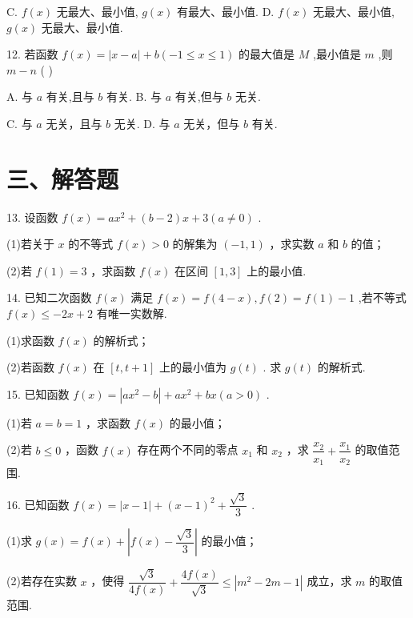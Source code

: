 C. $f\left( x\right)$ 无最大、最小值, $g\left( x\right)$ 有最大、最小值. D. $f\left( x\right)$ 无最大、最小值, $g\left( x\right)$ 无最大、最小值.


12. 若函数 $f\left( x\right)  = \left| {x - a}\right|  + b\left( {-1 \leq  x \leq  1}\right)$ 的最大值是 $M$ ,最小值是 $m$ ,则 $m - n$ ( )

A. 与 $a$ 有关,且与 $b$ 有关. B. 与 $a$ 有关,但与 $b$ 无关.

C. 与 $a$ 无关，且与 $b$ 无关. D. 与 $a$ 无关，但与 $b$ 有关.

\section*{三、解答题}

13. 设函数 $f\left( x\right)  = a{x}^{2} + \left( {b - 2}\right) x + 3\left( {a \neq  0}\right)$ .

(1)若关于 $x$ 的不等式 $f\left( x\right)  > 0$ 的解集为 $\left( {-1,1}\right)$ ，求实数 $a$ 和 $b$ 的值；

(2)若 $f\left( 1\right)  = 3$ ，求函数 $f\left( x\right)$ 在区间 $\left\lbrack  {1,3}\right\rbrack$ 上的最小值.

14. 已知二次函数 $f\left( x\right)$ 满足 $f\left( x\right)  = f\left( {4 - x}\right) ,f\left( 2\right)  = f\left( 1\right)  - 1$ ,若不等式 $f\left( x\right)  \leq   - {2x} + 2$ 有唯一实数解.

(1)求函数 $f\left( x\right)$ 的解析式；

(2)若函数 $f\left( x\right)$ 在 $\left\lbrack  {t,t + 1}\right\rbrack$ 上的最小值为 $g\left( t\right)$ . 求 $g\left( t\right)$ 的解析式.

15. 已知函数 $f\left( x\right)  = \left| {a{x}^{2} - b}\right|  + a{x}^{2} + {bx}\left( {a > 0}\right)$ .

(1)若 $a = b = 1$ ，求函数 $f\left( x\right)$ 的最小值；

(2)若 $b \leq  0$ ，函数 $f\left( x\right)$ 存在两个不同的零点 ${x}_{1}$ 和 ${x}_{2}$ ，求 $\dfrac{{x}_{2}}{{x}_{1}} + \dfrac{{x}_{1}}{{x}_{2}}$ 的取值范围.

16. 已知函数 $f\left( x\right)  = \left| {x - 1}\right|  + {\left( x - 1\right) }^{2} + \dfrac{\sqrt{3}}{3}$ .

(1)求 $g\left( x\right)  = f\left( x\right)  + \left| {f\left( x\right)  - \dfrac{\sqrt{3}}{3}}\right|$ 的最小值；

(2)若存在实数 $x$ ，使得 $\dfrac{\sqrt{3}}{{4f}\left( x\right) } + \dfrac{{4f}\left( x\right) }{\sqrt{3}} \leq  \left| {{m}^{2} - {2m} - 1}\right|$ 成立，求 $m$ 的取值范围.

